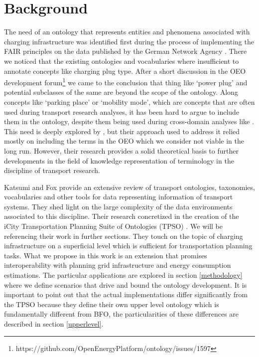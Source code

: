 ﻿\section{Background}
\label{statementofneed}
The need of an ontology that represents entities and phenomena associated with
charging infrastructure was identified first during the process of implementing
the FAIR principles on the data published by the German Network Agency
\cite{ArellanoRuiz.2024}. There we noticed that the existing ontologies and
vocabularies where insufficient to annotate concepts like charging plug type.
After a short discussion in the OEO development
forum\footnote{https://github.com/OpenEnergyPlatform/ontology/issues/1597} we
came to the conclusion that thing like `power plug' and potential subclasses of
the same are beyond the scope of the ontology. Along concepts like `parking
place' or `mobility mode', which are concepts that are often used during
transport research analyses, it has been hard to argue to include them in the
ontology, despite them being used during cross-domain analyses like
\cite{Hecht.2022}. This need is deeply explored by \cite{Mittermeier.2023}, but
their approach used to address it relied mostly on including the terms in the
OEO which we consider not viable in the long run. However, their research
provides a solid theoretical basis to further developments in the field of
knowledge representation of terminology in the discipline of transport
research.

Katsumi and Fox \cite{Katsumi.2018} provide an extensive review of transport
ontologies, taxonomies, vocabularies and other tools for data representing
information of transport systems. They shed light on the large complexity of
the data environments associated to this discipline. Their research concretized
in the creation of the iCity Transportation Planning Suite of Ontologies (TPSO)
\cite{Katsumi.2019}. We will be referencing their work in further sections.
They touch on the topic of charging infrastructure on a superficial level which
is sufficient for transportation planning tasks. What we propose in this work
is an extension that promises interoperability with planning grid
infrastructure and energy consumption estimations. The particular applications
are explored in section \ref{methodology} where we define scenarios that drive
and bound the ontology development. It is important to point out that the actual
implementations differ significantly from the TPSO because they define their
own upper level ontology which is fundamentally different from BFO, the
particularities of these differences are described in section \ref{upperlevel}.